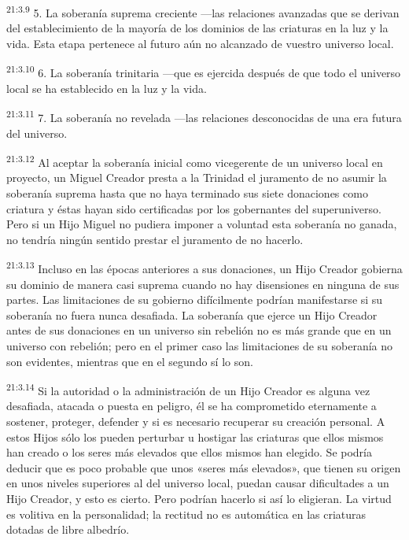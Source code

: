 \par
\textsuperscript{21:3.9} 5. La soberanía suprema creciente ---las relaciones avanzadas que se derivan del establecimiento de la mayoría de los dominios de las criaturas en la luz y la vida. Esta etapa pertenece al futuro aún no alcanzado de vuestro universo local.

\par
\textsuperscript{21:3.10} 6. La soberanía trinitaria ---que es ejercida después de que todo el universo local se ha establecido en la luz y la vida.

\par
\textsuperscript{21:3.11} 7. La soberanía no revelada ---las relaciones desconocidas de una era futura del universo.

\par
\textsuperscript{21:3.12} Al aceptar la soberanía inicial como vicegerente de un universo local en proyecto, un Miguel Creador presta a la Trinidad el juramento de no asumir la soberanía suprema hasta que no haya terminado sus siete donaciones como criatura y éstas hayan sido certificadas por los gobernantes del superuniverso. Pero si un Hijo Miguel no pudiera imponer a voluntad esta soberanía no ganada, no tendría ningún sentido prestar el juramento de no hacerlo.

\par
\textsuperscript{21:3.13} Incluso en las épocas anteriores a sus donaciones, un Hijo Creador gobierna su dominio de manera casi suprema cuando no hay disensiones en ninguna de sus partes. Las limitaciones de su gobierno difícilmente podrían manifestarse si su soberanía no fuera nunca desafiada. La soberanía que ejerce un Hijo Creador antes de sus donaciones en un universo sin rebelión no es más grande que en un universo con rebelión; pero en el primer caso las limitaciones de su soberanía no son evidentes, mientras que en el segundo sí lo son.

\par
\textsuperscript{21:3.14} Si la autoridad o la administración de un Hijo Creador es alguna vez desafiada, atacada o puesta en peligro, él se ha comprometido eternamente a sostener, proteger, defender y si es necesario recuperar su creación personal. A estos Hijos sólo los pueden perturbar u hostigar las criaturas que ellos mismos han creado o los seres más elevados que ellos mismos han elegido. Se podría deducir que es poco probable que unos «seres más elevados», que tienen su origen en unos niveles superiores al del universo local, puedan causar dificultades a un Hijo Creador, y esto es cierto. Pero podrían hacerlo si así lo eligieran. La virtud es volitiva en la personalidad; la rectitud no es automática en las criaturas dotadas de libre albedrío.

